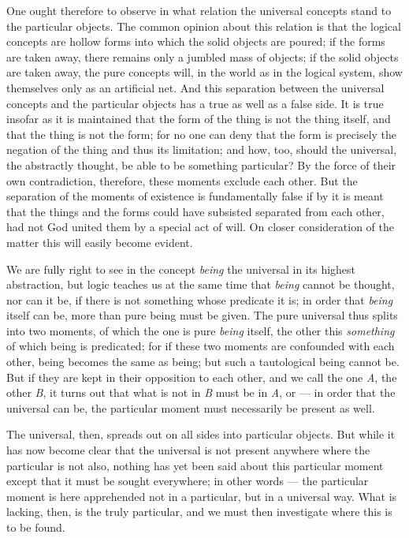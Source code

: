 \documentclass[12pt]{book}
\newcommand{\opage}[1]{\marginnote{\footnotesize\textit{[#1]}}}
\begin{document}
One ought therefore to observe in what relation the universal concepts stand to
the particular objects. The common opinion about this relation is that the
logical concepts are hollow forms into which the solid objects are poured; if
the forms are taken away, there remains only a jumbled mass of objects; if the
solid objects are taken away, the pure concepts will, in the world as in the
logical system, show themselves only as an artificial net. And this separation
between the universal concepts and the particular objects has a true as well as
a false side. It is true insofar as it is maintained that the form of the thing
is not the thing itself, and that the thing is not the form; for no one can deny
that the form is precisely the negation of the thing and thus its limitation;
and how, too, should the universal, the abstractly thought, be able to be
something particular? By the force of their own
\opage{9} contradiction, therefore, these moments exclude each other. But the
separation of the moments of existence is fundamentally false if by it is meant
that the things and the forms could have subsisted separated from each other,
had not God united them by a special act of will. On closer consideration of the
matter this will easily become evident.

We are fully right to see in the concept \emph{being} the universal in its
highest abstraction, but logic teaches us at the same time that \emph{being}
cannot be thought, nor can it be, if there is not something whose predicate it
is; in order that \emph{being} itself can be, more than pure being must be
given. The pure universal thus splits into two moments, of which the one is pure
\emph{being} itself, the other this \emph{something} of which being is
predicated; for if these two moments are confounded with each other, being
becomes the same as being; but such a tautological being cannot be. But if they
are kept in their opposition to each other, and we call the one \textit{A}, the
other \textit{B}, it turns out that what is not in \textit{B} must be in
\textit{A}, or --- in order that the universal can be, the particular moment
must necessarily be present as well.

The universal, then, spreads out on all sides into particular objects. But
while it has now become clear that the universal is not present anywhere where
the particular is not also, nothing has yet been said about this particular
moment except that it must be sought everywhere; in other words --- the
particular moment is here apprehended not in a particular, but in a universal
way. What is lacking, then, is the truly particular, and we must then
investigate where this is to be found.
\end{document}
